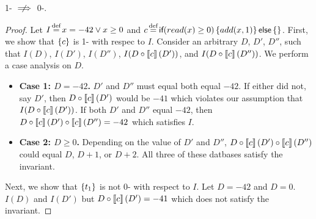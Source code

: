 \begin{claim}\label{clm:1-iconvergence-not-implies-0-isafety}
  1-\iconvergence{} $\centernot\implies$ 0-\isafety{}.
\end{claim}
\begin{proof}
  Let
    $I \defeq x = -42 \lor x \geq 0$ and
    $c \defeq \impif{read(x)\geq0}{add(x,1)}{}$.
  First, we show that $\left\{c\right\}$ is 1-\iconvergent{} with respec to $I$.
  Consider an arbitrary $D$,
    $D'$, $D''$, such that
    $I(D)$,
    $I(D')$,
    $I(D'')$,
    $I(D \circ \left\llbracket c\right\rrbracket(D'))$, and
    $I(D \circ \left\llbracket c\right\rrbracket(D''))$.
  We perform a case analysis on $D$.
  \begin{itemize}
    \item \textbf{Case 1: $D = -42$.}
      $D'$ and $D''$ must equal both equal $-42$. If either did not, say $D'$,
      then $D \circ \left\llbracket c\right\rrbracket(D')$ would be $-41$ which violates our
      assumption that $I(D \circ \left\llbracket c\right\rrbracket(D'))$. If both $D'$ and $D''$ equal
      $-42$, then $D \circ \left\llbracket c\right\rrbracket(D') \circ \left\llbracket c\right\rrbracket(D'') = -42$ which
      satisfies $I$.
    \item \textbf{Case 2: $D \geq 0$.}
      Depending on the value of $D'$ and $D''$, $D \circ \left\llbracket c\right\rrbracket(D') \circ
      \left\llbracket c\right\rrbracket(D'')$ could equal $D$, $D + 1$, or $D + 2$. All three of these
      datbases satisfy the invariant.
  \end{itemize}

  Next, we show that $\left\{t_1\right\}$ is not 0-\isafe{} with respect to $I$. Let $D
  = -42$ and $D = 0$. $I(D)$ and $I(D')$ but $D \circ \left\llbracket c\right\rrbracket(D') = -41$
  which does not satisfy the invariant.
\end{proof}
